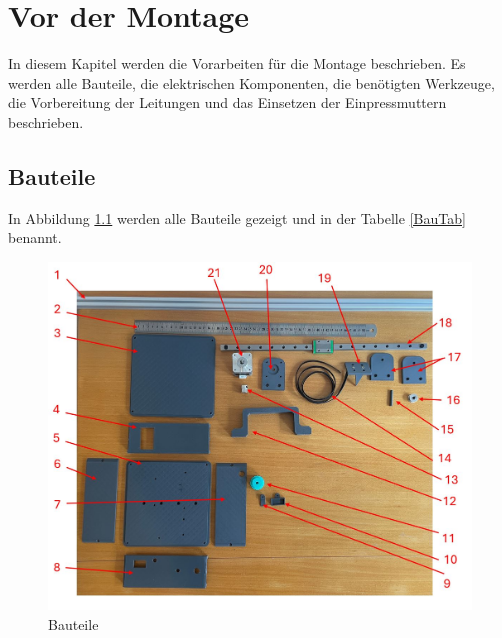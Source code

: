 %
\chapter{Vor der Montage}
In diesem Kapitel werden die Vorarbeiten für die Montage beschrieben. Es werden alle Bauteile, die elektrischen Komponenten, die benötigten Werkzeuge, die Vorbereitung der Leitungen und das Einsetzen der Einpressmuttern beschrieben.

\section{Bauteile}
In Abbildung \ref{Bauteile} werden alle Bauteile gezeigt und in der Tabelle \ref{BauTab} benannt.

\begin{figure}[H]
	\begin{center}
		\includegraphics[width=\textwidth]{Images/BauTeile.jpg}
		\caption{Bauteile} \label{Bauteile}
	\end{center}
\end{figure}

